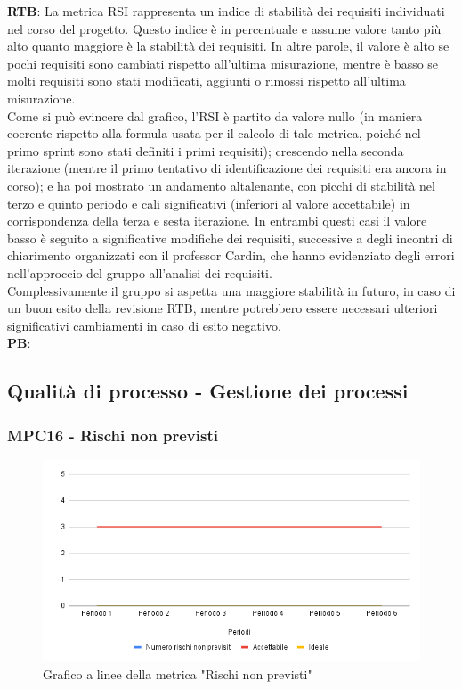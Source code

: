 \documentclass[10pt]{article}
\begin{document}
\begin{justify}
\textbf{RTB}: La metrica RSI rappresenta un indice di stabilità dei requisiti individuati nel corso del progetto. Questo indice è in percentuale e assume valore tanto più alto 
quanto maggiore è la stabilità dei requisiti. In altre parole, il valore è alto se pochi requisiti sono cambiati rispetto all'ultima misurazione, mentre è basso se molti requisiti sono
stati modificati, aggiunti o rimossi rispetto all'ultima misurazione.\\
Come si può evincere dal grafico, l'RSI è partito da valore nullo (in maniera coerente rispetto alla formula usata per il calcolo di tale metrica, poiché nel primo sprint 
sono stati definiti i primi requisiti); crescendo nella seconda iterazione (mentre il primo tentativo di identificazione dei requisiti era ancora in corso); e ha poi mostrato 
un andamento altalenante, con picchi di stabilità nel terzo e quinto periodo e cali significativi (inferiori al valore accettabile) in corrispondenza della terza e sesta iterazione. In entrambi questi 
casi il valore basso è seguito a significative modifiche dei requisiti, successive a degli incontri di chiarimento organizzati con il professor Cardin, che  hanno 
evidenziato degli errori nell'approccio del gruppo all'analisi dei requisiti.\\
Complessivamente il gruppo si aspetta una maggiore stabilità in futuro, in caso di un buon esito della revisione RTB, mentre potrebbero essere necessari ulteriori
significativi cambiamenti in caso di esito negativo.\\

\noindent
\textbf{PB}:


\subsection{Qualità di processo - Gestione dei processi}
\subsubsection{MPC16 - Rischi non previsti}%

\begin{figure}[H]
  \centering
  \includegraphics[width=0.9\linewidth]{RNP.png}
  \caption{Grafico a linee della metrica "Rischi non previsti"}
  \label{fig:RNPchart}
\end{figure}


\end{justify}
\end{document}
